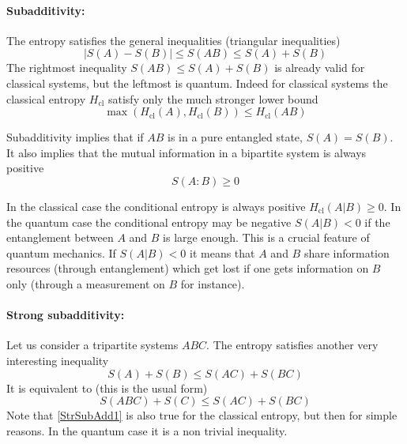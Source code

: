 \paragraph{Subadditivity:} 
The entropy satisfies the general inequalities (triangular inequalities)
\begin{equation}
\label{subaddS}
|S(A)-S(B)|\le S({AB})\le S(A)+S(B)
\end{equation}
The rightmost inequality $S({AB})\le S(A)+S(B)$ is already valid for classical systems, but the leftmost  is quantum.
Indeed for classical systems the classical entropy $H_\mathrm{cl}$ satisfy only the much stronger lower bound
\begin{equation}
\label{CaddS}
\max(H_\mathrm{cl}(A),H_\mathrm{cl}(B)) \le H_\mathrm{cl}(AB)%
\end{equation}

Subadditivity implies that if $AB$ is in a pure entangled state, $S(A)=S(B)$.
It also implies that the mutual information in a bipartite system is always positive
\begin{equation}
\label{MutInfPos}
S(A:B)\ge 0
\end{equation}

In the classical case the conditional entropy is always positive $H_\mathrm{cl}(A|B)\ge 0$.
In the quantum case the conditional entropy may be negative $S(A|B)< 0$ if the entanglement between $A$ and $B$ is large enough.
This is a crucial feature of quantum mechanics. If $S(A|B)<0$ it means that $A$ and $B$ share information resources (through entanglement) which get lost if one gets information on $B$ only (through a measurement on $B$ for instance). 

\paragraph{Strong subadditivity:}
Let us consider a tripartite systems $ABC$. The entropy satisfies another very interesting inequality
\begin{equation}
\label{StrSubAdd1}
S(A)+S(B)\le S({AC})+S({BC})
\end{equation}
It is equivalent to (this is the usual form)
\begin{equation}
\label{StrSubAdd2}
S({ABC})+S({C})\le S({AC})+S({BC})
\end{equation}
Note that \ref{StrSubAdd1} is also true for the classical entropy, but then for simple reasons. In the quantum case it is a non trivial inequality.


